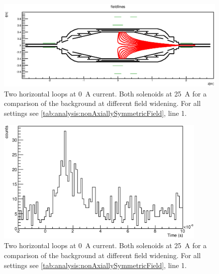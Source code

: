 \begin{figure}
\centering
	\centerline{\includegraphics[width = 1.3\linewidth]{graphics/analysis/monSpec/fieldSimulation/AC.eps} }
	
	\caption[\SI{50}{\ampere} loops]{Two horizontal loops at \SI{0}{\ampere} current. Both solenoids at \SI{25}{\ampere} for a comparison of the background at different field widening. For all settings see \ref{tab:analysis:nonAxiallySymmetricField}, line 1.}
	\label{fig:ACf}
\end{figure}

\begin{figure}[h]
\centering
	\includegraphics[width = 0.9\textwidth]{graphics/analysis/monSpec/AC.eps}
	\caption[\SI{50}{\ampere} loops]{Two horizontal loops at \SI{0}{\ampere} current. Both solenoids at \SI{25}{\ampere} for a comparison of the background at different field widening. For all settings see \ref{tab:analysis:nonAxiallySymmetricField}, line 1.}
	\label{fig:AC}
\end{figure}
\clearpage






